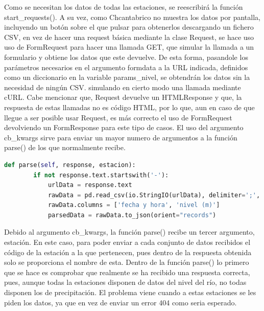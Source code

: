 Como se necesitan los datos de todas las estaciones, se reescribirá la función start\_requests().\newline
\newline
A su vez, como Chcantabrico no muestra los datos por pantalla, incluyendo un botón sobre el que pulsar para obtenerlos descargando un fichero CSV, en vez de hacer una request básica mediante la clase Request, se hace uso uso de FormRequest para hacer una llamada GET, que simular la llamada a un formulario y obtiene los datos que este devuelve.\newline
\newline
De esta forma, pasandole los parámetros necesarios en el argumento formdata a la URL indicada, definidos como un diccionario en la variable params\_nivel, se obtendrán los datos sin la necesidad de ningún CSV. simulando en cierto modo una llamada mediante cURL.\newline
\newline
Cabe mencionar que, Request devuelve un HTMLResponse y que, la respuesta de estas llamadas no es código HTML, por lo que, aun en caso de que llegue a ser posible usar Request, es más correcto el uso de FormRequest devolviendo un FormResponse para este tipo de casos.\newline
\newline
El uso del argumento cb\_kwargs sirve para enviar un mayor numero de argumentos a la función parse() de los que normalmente recibe.

\begin{lstlisting}[language=Python, caption={Función parse() Chcantabrico Nivel Spider}]
	def parse(self, response, estacion):
		if not response.text.startswith('-'):
			urlData = response.text
			rawData = pd.read_csv(io.StringIO(urlData), delimiter=';', encoding='utf-8', header=1)
			rawData.columns = ['fecha y hora', 'nivel (m)']
			parsedData = rawData.to_json(orient="records")
\end{lstlisting}

Debido al argumento cb\_kwargs, la función parse() recibe un tercer argumento, estación. En este caso, para poder enviar a cada conjunto de datos recibidos el código de la estación a la que pertenecen, pues dentro de la respuesta obtenida solo se proporciona el nombre de esta.\newline
\newline
Dentro de la función parse() lo primero que se hace es comprobar que realmente se ha recibido una respuesta correcta, pues, aunque todas la estaciones disponen de datos del nivel del río, no todas disponen los de precipitación. El problema viene cuando a estas estaciones se les piden los datos, ya que en vez de enviar un error 404 como seria esperado.

